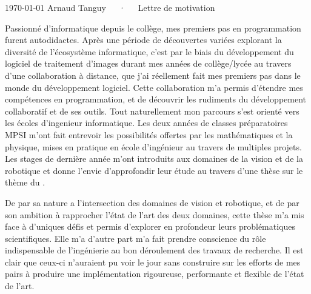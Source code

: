 \documentclass[11pt, a4paper]{awesome-cv}
\begin{document}
\makecvheader[R]

\makecvfooter
  {\today}
  {Arnaud Tanguy~~~·~~~Lettre de motivation}
  {}

\makelettertitle

\begin{cvletter}

  Passionné d'informatique depuis le collège, mes premiers pas en programmation furent autodidactes. Après une période de découvertes variées explorant la diversité de l'écosystème informatique, c'est par le biais du développement du logiciel  de traitement d'images  durant mes années de collège/lycée au travers d'une collaboration à distance, que j'ai réellement fait mes premiers pas dans le monde du développement logiciel. Cette collaboration m'a permis d'étendre mes compétences en programmation, et de découvrir les rudiments du développement collaboratif et de ses outils. Tout naturellement mon parcours s'est orienté vers les écoles d'ingenieur informatique. Les deux années de classes préparatoires MPSI m'ont fait entrevoir les possibilités offertes par les mathématiques et la physique, mises en pratique en école d'ingénieur au travers de multiples projets. Les stages de dernière année m'ont introduits aux domaines de la vision et de la robotique et donne l'envie d'approfondir leur étude au travers d'une thèse sur le thème du .

De par sa nature a l'intersection des domaines de vision et robotique, et de par son ambition à rapprocher l'état de l'art des deux domaines, cette thèse m'a mis face à d'uniques défis et permis d'explorer en profondeur leurs problématiques scientifiques. Elle m'a d'autre part m'a fait prendre conscience du rôle indispensable de l'ingénierie au bon déroulement des travaux de recherche. Il est clair que ceux-ci n'auraient pu voir le jour sans construire sur les efforts de mes pairs à produire une implémentation rigoureuse, performante et flexible de l'état de l'art.


\end{cvletter}
\end{document}
